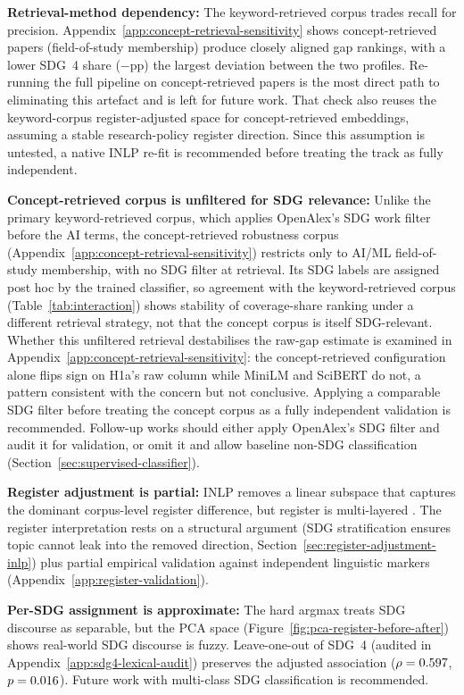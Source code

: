 \documentclass[12pt,a4paper]{article}
\begin{document}
\textbf{Retrieval-method dependency:} The keyword-retrieved corpus trades recall for precision. Appendix~\ref{app:concept-retrieval-sensitivity} shows concept-retrieved papers (field-of-study membership) produce closely aligned gap rankings, with a lower SDG~4 share ($-$\ConceptCoverageMaxAbsDelta{}pp) the largest deviation between the two profiles. Re-running the full pipeline on concept-retrieved papers is the most direct path to eliminating this artefact and is left for future work. That check also reuses the keyword-corpus register-adjusted space for concept-retrieved embeddings, assuming a stable research-policy register direction. Since this assumption is untested, a native INLP re-fit is recommended before treating the track as fully independent.

\textbf{Concept-retrieved corpus is unfiltered for SDG relevance:} Unlike the primary keyword-retrieved corpus, which applies OpenAlex's SDG work filter before the AI terms, the concept-retrieved robustness corpus (Appendix~\ref{app:concept-retrieval-sensitivity}) restricts only to AI/ML field-of-study membership, with no SDG filter at retrieval. Its SDG labels are assigned post hoc by the trained classifier, so agreement with the keyword-retrieved corpus (Table~\ref{tab:interaction}) shows stability of coverage-share ranking under a different retrieval strategy, not that the concept corpus is itself SDG-relevant. Whether this unfiltered retrieval destabilises the raw-gap estimate is examined in Appendix~\ref{app:concept-retrieval-sensitivity}: the concept-retrieved configuration alone flips sign on H1a's raw column while MiniLM and SciBERT do not, a pattern consistent with the concern but not conclusive. Applying a comparable SDG filter before treating the concept corpus as a fully independent validation is recommended. Follow-up works should either apply OpenAlex's SDG filter and audit it for validation, or omit it and allow baseline non-SDG classification (Section~\ref{sec:supervised-classifier}).

\textbf{Register adjustment is partial:} INLP removes a linear subspace that captures the dominant corpus-level register difference, but register is multi-layered \parencite{biber1988variation}. The register interpretation rests on a structural argument (SDG stratification ensures topic cannot leak into the removed direction, Section~\ref{sec:register-adjustment-inlp}) plus partial empirical validation against independent linguistic markers (Appendix~\ref{app:register-validation}).

\textbf{Per-SDG assignment is approximate:} The hard argmax treats SDG discourse as separable, but the PCA space (Figure~\ref{fig:pca-register-before-after}) shows real-world SDG discourse is fuzzy. Leave-one-out of SDG~4 (audited in Appendix~\ref{app:sdg4-lexical-audit}) preserves the adjusted association ($\rho = 0.597$, $p = 0.016$). Future work with multi-class SDG classification is recommended.
\end{document}
